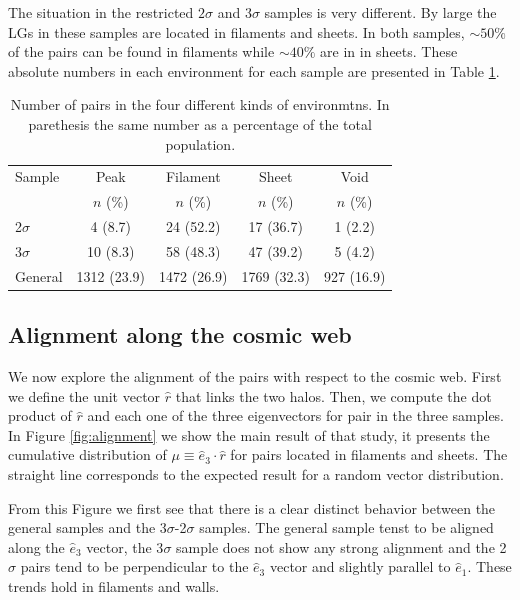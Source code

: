\documentclass{emulateapj}
\begin{document}
The situation in the restricted $2\sigma$ and $3\sigma$ samples is very
different. By large the LGs in these samples are located in
filaments and sheets. In both samples, $\sim 50\%$ of the
pairs can be found in filaments while $\sim 40\%$ are in
in sheets. These absolute numbers in each environment for each sample
are presented in Table \ref{table:web_type}. 
 
\begin{table}
\begin{center}
\begin{tabular}{lcccc}\hline\hline
Sample & Peak & Filament & Sheet & Void\\
       & $n$ (\%) & $n$ (\%) & $n$ (\%) & $n$ (\%) \\\hline
2$\sigma$ & 4 (8.7) & 24 (52.2) &  17 (36.7) & 1 (2.2)\\
3$\sigma$ & 10 (8.3) & 58 (48.3) & 47 (39.2) & 5 (4.2)\\  
General & 1312 (23.9) & 1472 (26.9) & 1769 (32.3) & 927 (16.9)\\\hline
\end{tabular}
\caption{
Number of pairs in the four different kinds of environmtns. In
parethesis the same number as a percentage of the
total population. 
\label{table:web_type}}
\end{center}
\end{table}

\subsection{Alignment along the cosmic web}

We now explore the alignment of the pairs with respect to the cosmic
web. First we define the unit vector $\hat{r}$ that links the two
halos. Then, we compute the dot product of $\hat{r}$ and each one of
the three eigenvectors for pair in the three samples. In Figure
\ref{fig:alignment} we show the main result of that study, it
presents the cumulative distribution of
$\mu\equiv\hat{e}_3\cdot\hat{r}$ for pairs located in filaments and
sheets. The straight line corresponds to the expected result for a
random vector distribution. 


From this Figure we first see that there is a clear distinct behavior
between the general samples and the 3$\sigma$-2$\sigma$ samples. The
general sample tenst to be aligned along the $\hat{e}_3$ vector, the
3$\sigma$ sample does not show any strong alignment and the 2$\sigma$
pairs tend to be perpendicular to the $\hat{e}_3$ vector and slightly
parallel to $\hat{e}_1$. These trends hold in filaments and walls.
\end{document}
